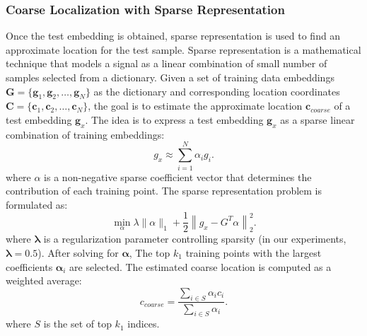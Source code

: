 \documentclass[journal,twoside,web]{ieeecolor}
\begin{document}
\subsubsection{Coarse Localization with Sparse Representation}
Once the test embedding is obtained, sparse representation is used to find an approximate location for the test sample. Sparse representation is a mathematical technique that models a signal as a linear combination of small number of samples selected from a dictionary. Given a set of training data embeddings \(  \mathbf{G} = \{ \mathbf{g}_1, \mathbf{g}_2, \dots, \mathbf{g}_N \} \) as the dictionary and corresponding location coordinates \( \mathbf{C} = \{ \mathbf{c}_1, \mathbf{c}_2, \dots, \mathbf{c}_N \} \),  the goal is to estimate the approximate location \( \mathbf{c}_{coarse} \) of a test embedding \( \mathbf{g}_x \). The idea is to express a test embedding $ \mathbf{g}_x $ as a sparse linear combination of training embeddings:
\begin{equation}
    g_x \approx \sum_{i=1}^{N} \alpha_i g_i .
\end{equation}
where \( \alpha \) is a non-negative sparse coefficient vector that determines the contribution of each training point. The sparse representation problem is formulated as:
\begin{equation}
    \min_{\alpha} \lambda \| \alpha \|_1 + \frac{1}{2}\left\| g_x - G^T \alpha \right\|_2^2 .
\end{equation}
where \( \mathbf{\lambda} \) is a regularization parameter controlling sparsity (in our experiments, \( \mathbf{\lambda}=0.5 \)).
After solving for \( \mathbf{\alpha} \), The top \( k_1 \) training points with the largest coefficients \( \mathbf{\alpha}_i \) are selected. The estimated coarse location is computed as a weighted average:
\begin{equation}
    c_{coarse} = \frac{\sum_{i \in S} \alpha_i c_i}{\sum_{i \in S} \alpha_i}.
\end{equation}
where \( S \) is the set of top \( k_1 \) indices.
\end{document}
